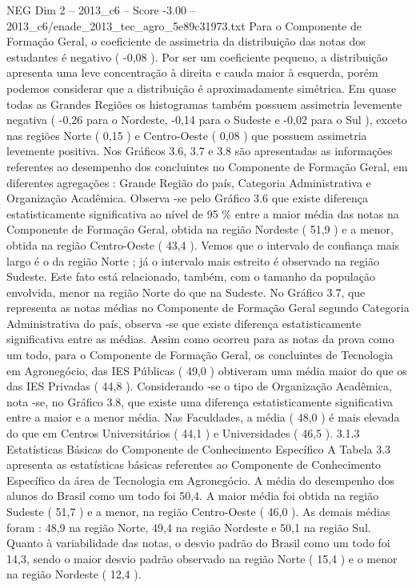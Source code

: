 \begin{textsample}{NEG Dim 2 – 2013\_c6 – Score -3.00 – 2013\_c6/enade\_2013\_tec\_agro\_5e89c31973.txt}
Para o Componente de Formação Geral, o coeficiente de assimetria da distribuição das notas dos estudantes é negativo ( -0,08 ).
Por ser um coeficiente pequeno, a distribuição apresenta uma leve concentração à direita e cauda maior à esquerda, porém podemos considerar que a distribuição é aproximadamente simétrica.
Em quase todas as Grandes Regiões os histogramas também possuem assimetria levemente negativa ( -0,26 para o Nordeste, -0,14 para o Sudeste e -0,02 para o Sul ), exceto nas regiões Norte ( 0,15 ) e Centro-Oeste ( 0,08 ) que possuem assimetria levemente positiva.
Nos Gráficos 3.6, 3.7 e 3.8 são apresentadas as informações referentes ao desempenho dos concluintes no Componente de Formação Geral, em diferentes agregações : Grande Região do país, Categoria Administrativa e Organização Acadêmica.
Observa -se pelo Gráfico 3.6 que existe diferença estatisticamente significativa ao nível de 95 \% entre a maior média das notas na Componente de Formação Geral, obtida na região Nordeste ( 51,9 ) e a menor, obtida na região Centro-Oeste ( 43,4 ).
Vemos que o intervalo de confiança mais largo é o da região Norte ; já o intervalo mais estreito é observado na região Sudeste.
Este fato está relacionado, também, com o tamanho da população envolvida, menor na região Norte do que na Sudeste.
No Gráfico 3.7, que representa as notas médias no Componente de Formação Geral segundo Categoria Administrativa do país, observa -se que existe diferença estatisticamente significativa entre as médias.
Assim como ocorreu para as notas da prova como um todo, para o Componente de Formação Geral, os concluintes de Tecnologia em Agronegócio, das IES Públicas ( 49,0 ) obtiveram uma média maior do que os das IES Privadas ( 44,8 ).
Considerando -se o tipo de Organização Acadêmica, nota -se, no Gráfico 3.8, que existe uma diferença estatisticamente significativa entre a maior e a menor média.
Nas Faculdades, a média ( 48,0 ) é mais elevada do que em Centros Universitários ( 44,1 ) e Universidades ( 46,5 ). 3.1.3 Estatísticas Básicas do Componente de Conhecimento Específico A Tabela 3.3 apresenta as estatísticas básicas referentes ao Componente de Conhecimento Específico da área de Tecnologia em Agronegócio.
A média do desempenho dos alunos do Brasil como um todo foi 50,4.
A maior média foi obtida na região Sudeste ( 51,7 ) e a menor, na região Centro-Oeste ( 46,0 ).
As demais médias foram : 48,9 na região Norte, 49,4 na região Nordeste e 50,1 na região Sul.
Quanto à variabilidade das notas, o desvio padrão do Brasil como um todo foi 14,3, sendo o maior desvio padrão observado na região Norte ( 15,4 ) e o menor na região Nordeste ( 12,4 ).

\end{textsample}

